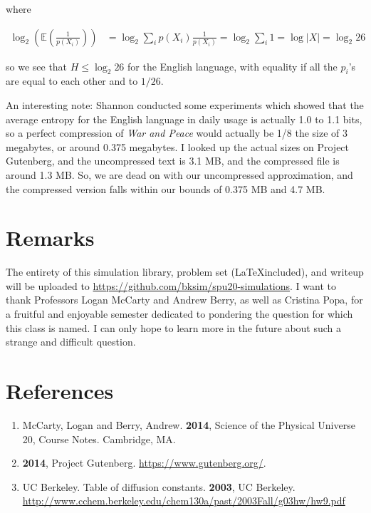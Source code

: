 \documentclass[12pt]{article}
\newcommand{\E}{\mathbb{E}}
\begin{document}
\begin{enumerate}
where

\begin{align*}
\log_2\left(\E\left(\frac{1}{p(X_i)}\right)\right)  &= \log_2 \sum_i p(X_i) \frac{1}{p(X_i)} = \log_2\sum_i 1 = \log |X| = \log_2 26
\end{align*}

so we see that $H \leq \log_2 26$ for the English language, with equality if all the $p_i$'s are equal to each other and to $1/26$. 

An interesting note: Shannon conducted some experiments which showed that the average entropy for the English language in daily usage is actually 1.0 to 1.1 bits, so a perfect compression of \textit{War and Peace} would actually be 1/8 the size of 3 megabytes, or around 0.375 megabytes. I looked up the actual sizes on Project Gutenberg, and the uncompressed text is 3.1 MB, and the compressed file is around 1.3 MB. So, we are dead on with our uncompressed approximation, and the compressed version falls within our bounds of 0.375 MB and 4.7 MB. 
\end{enumerate}


\section{Remarks}
The entirety of this simulation library, problem set (\LaTeX included), and writeup will be uploaded to \url{https://github.com/bksim/spu20-simulations}. I want to thank Professors Logan McCarty and Andrew Berry, as well as Cristina Popa, for a fruitful and enjoyable semester dedicated to pondering the question for which this class is named. I can only hope to learn more in the future about such a strange and difficult question.

\section{References}
\begin{enumerate}
\item McCarty, Logan and Berry, Andrew. \textbf{2014}, Science of the Physical Universe 20, Course Notes. Cambridge, MA.
\item \textbf{2014}, Project Gutenberg. \url{https://www.gutenberg.org/}.
\item UC Berkeley. Table of diffusion constants. \textbf{2003}, UC Berkeley. \url{http://www.cchem.berkeley.edu/chem130a/past/2003Fall/g03hw/hw9.pdf}
\end{enumerate}
\end{document}
